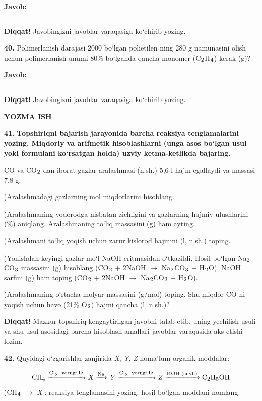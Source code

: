 \documentclass[11pt,a4paper]{article}
\renewcommand{\textsubscript}[1]{\ensuremath{_{\text{\fontsize{8}{8}\selectfont #1}}}}
\newcommand{\diqqat}[1]{\par\smallskip\noindent\textbf{Diqqat!} #1\par\medskip}
\newcommand{\javob}{\par\smallskip\noindent\textbf{Javob:} \rule[-2pt]{7.5cm}{0.4pt}\par\smallskip\noindent\textbf{Diqqat!} Javobingizni javoblar varaqasiga ko`chirib yozing.\par\medskip}
\begin{document}
\javob
\noindent\textbf{40.} Polimerlanish darajasi 2000 bo`lgan polietilen ning 280 g namunasini olish uchun polimerlanish unumi 80\% bo`lganda qancha monomer (C\textsubscript{2}H\textsubscript{4}) kerak (g)?
\javob
\par\bigskip\begin{center}\textbf{\fontsize{13}{15}\selectfont YOZMA ISH}\end{center}
\noindent\textbf{41.} \textbf{Topshiriqni bajarish jarayonida barcha reaksiya tenglamalarini yozing. Miqdoriy va arifmetik hisoblashlarni (unga asos bo`lgan usul yoki formulani ko`rsatgan holda) uzviy ketma-ketlikda bajaring.}\par\smallskip
CO va CO\textsubscript{2} dan iborat gazlar aralashmasi (n.sh.) 5,6 l hajm egallaydi va massasi 7,8 g.\par
{})Aralashmadagi gazlarning mol miqdorlarini hisoblang.\par
{})Aralashmaning vodorodga nisbatan zichligini va gazlarning hajmiy ulushlarini (\%) aniqlang. Aralashmaning to`liq massasini (g) ham ayting.\par
{})Aralashmani to`liq yoqish uchun zarur kislorod hajmini (l, n.sh.) toping.\par
{})Yonishdan keyingi gazlar mo`l NaOH eritmasidan o`tkazildi. Hosil bo`lgan Na\textsubscript{2}CO\textsubscript{3} massasini (g) hisoblang (CO\textsubscript{2} + 2NaOH $\to$ Na\textsubscript{2}CO\textsubscript{3} + H\textsubscript{2}O). NaOH sarfini (g) ham toping (CO\textsubscript{2} + 2NaOH $\to$ Na\textsubscript{2}CO\textsubscript{3} + H\textsubscript{2}O).\par
{})Aralashmaning o`rtacha molyar massasini (g/mol) toping. Shu miqdor CO ni yoqish uchun havo (21\% O\textsubscript{2}) hajmi qancha (l, n.sh.)?\par
\diqqat{Mazkur topshiriq kengaytirilgan javobni talab etib, uning yechilish usuli va shu usul asosidagi barcha hisoblash amallari javoblar varaqasida aks etishi lozim.}
\noindent\textbf{42.} Quyidagi o`zgarishlar zanjirida \textit{X}, \textit{Y}, \textit{Z} noma'lum organik moddalar:\par
\[\setlength{\fboxsep}{0pt}\text{CH\textsubscript{4}}\xrightarrow{\text{Cl\textsubscript{2}, yorug`lik}}\text{\textit{X}}\xrightarrow{\text{Na}}\text{\textit{Y}}\xrightarrow{\text{Cl\textsubscript{2}, yorug`lik}}\text{\textit{Z}}\xrightarrow{\text{KOH (suvli)}}\text{C\textsubscript{2}H\textsubscript{5}OH}\]
)CH\textsubscript{4} $\to$ \textit{X} : reaksiya tenglamasini yozing; hosil bo`lgan moddani nomlang.\par
\end{document}
